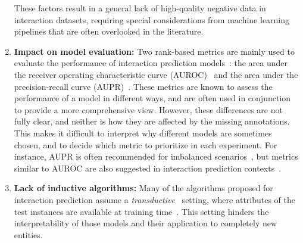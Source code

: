\begin{enumerate}
    These factors result in a general lack of high-quality negative data in interaction datasets, requiring special considerations from machine learning pipelines that are often overlooked in the literature.
    \item \textbf{Impact on model evaluation:} Two rank-based metrics are mainly used to evaluate the performance of interaction prediction models~\cite{lu2011link,zhou2021progresses,pahikkala2015more,chen2018machine}: the area under the receiver operating characteristic curve (AUROC)~\cite{davis2006relationship,hand2009measuring} and the area under the precision-recall curve (AUPR)~\cite{davis2006relationship,ozenne2015precision,flach2015precisionrecallgain}. These metrics are known to assess the performance of a model in different ways, and are often used in conjunction to provide a more comprehensive view.
    However, these differences are not fully clear, and neither is how they are affected by the missing annotations.
    This makes it difficult to interpret why different models are sometimes chosen,
    and to decide which metric to prioritize in each experiment. For instance, AUPR is often recommended for imbalanced scenarios~\cite{davis2006relationship,hand2009measuring,he2009learning,ezzat2019computational}, but metrics similar to AUROC are also suggested in interaction prediction contexts~\cite{pahikkala2015more,johnson2014logistic,hao2019opensource,ezzat2019computational,yu2020fpscdtia}.
    \item \textbf{Lack of inductive algorithms:} Many of the algorithms proposed for interaction prediction assume a \emph{transductive}~\cite{chapelle2006semisupervised} setting, where attributes of the test instances are available at training time~\cite{pahikkala2015more,ezzat2019computational}. This setting hinders the interpretability of those models and their application to completely new entities.
\end{enumerate}

